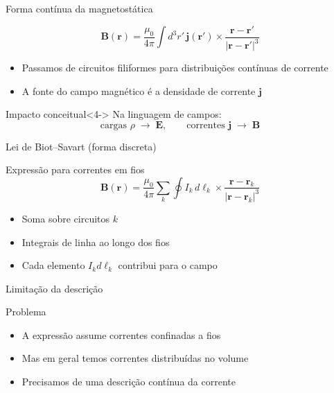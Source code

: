\documentclass[aspectratio=169]{beamer}
\begin{document}
\begin{frame}{Forma contínua da magnetostática}

\begin{equation}
\mathbf{B}(\mathbf{r}) =
\frac{\mu_0}{4\pi}
\int d^3r' \,
\mathbf{j}(\mathbf{r}') \times
\frac{\mathbf{r}-\mathbf{r}'}{|\mathbf{r}-\mathbf{r}'|^3}
\tag{2.26}
\end{equation}

\begin{itemize}
\item<2-> Passamos de circuitos filiformes para distribuições contínuas de corrente
\item<3-> A fonte do campo magnético é a densidade de corrente \(\mathbf j\)
\end{itemize}

\begin{alertblock}{Impacto conceitual}<4->
Na linguagem de campos:
\[
\text{cargas } \rho \;\longrightarrow\; \mathbf E,
\qquad
\text{correntes } \mathbf j \;\longrightarrow\; \mathbf B
\]
\end{alertblock}

\end{frame}


\begin{frame}{Lei de Biot–Savart (forma discreta)}

\begin{block}{Expressão para correntes em fios}
\begin{equation}
\mathbf{B}(\mathbf r)=\frac{\mu_0}{4\pi}\sum_k \oint I_k\, d\boldsymbol{\ell}_k\times
\frac{\mathbf r-\mathbf r_k}{|\mathbf r-\mathbf r_k|^3}
\tag{2.25}
\end{equation}
\end{block}

\begin{itemize}
\item<2-> Soma sobre circuitos \(k\)
\item<3-> Integrais de linha ao longo dos fios
\item<4-> Cada elemento \(I_k d\boldsymbol{\ell}_k\) contribui para o campo
\end{itemize}

\end{frame}

\begin{frame}{Limitação da descrição}

\begin{block}{Problema}
\begin{itemize}
\item<1-> A expressão assume correntes confinadas a fios
\item<2-> Mas em geral temos correntes distribuídas no volume
\item<3-> Precisamos de uma descrição contínua da corrente
\end{itemize}
\end{block}


\end{frame}
\end{document}
